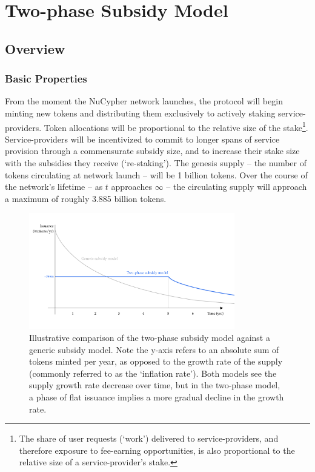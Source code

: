\documentclass[longbibliography,nofootinbib]{revtex4-1}
\begin{document}
\section{Two-phase Subsidy Model}

\subsection{Overview}

\subsubsection{Basic Properties}
From the moment the NuCypher network launches, the protocol will begin minting new tokens and distributing them exclusively to actively staking service-providers. Token allocations will be proportional to the relative size of the stake\footnote{The share of user requests (`work') delivered to service-providers, and therefore exposure to fee-earning opportunities, is also proportional to the relative size of a service-provider's stake.}. Service-providers will be incentivized to commit to longer spans of service provision through a commensurate subsidy size, and to increase their stake size with the subsidies they receive (`re-staking'). The genesis supply – the number of tokens circulating at network launch – will be 1 billion tokens. Over the course of the network's lifetime – as $t$ approaches $\infty$ – the circulating supply will approach a maximum of roughly 3.885 billion tokens.

\begin{figure}[h!]
    \includegraphics[width=0.8\textwidth]{Two_phase_model.png}
    \caption{Illustrative comparison of the two-phase subsidy model against a generic subsidy model. Note the y-axis refers to an absolute sum of tokens minted per year, as opposed to the growth rate of the supply (commonly referred to as the `inflation rate'). Both models see the supply growth rate decrease over time, but in the two-phase model, a phase of flat issuance implies a more gradual decline in the growth rate.}
    \label{fig:tp}
\end{figure}
\end{document}
